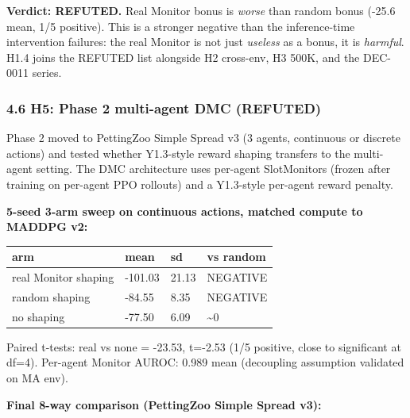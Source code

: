 \documentclass[
]{article}
\newcounter{none} %
\begin{document}
\textbf{Verdict: REFUTED.} Real Monitor bonus is \emph{worse} than
random bonus (-25.6 mean, 1/5 positive). This is a stronger negative
than the inference-time intervention failures: the real Monitor is not
just \emph{useless} as a bonus, it is \emph{harmful}. H1.4 joins the
REFUTED list alongside H2 cross-env, H3 500K, and the DEC-0011 series.

\subsubsection{4.6 H5: Phase 2 multi-agent DMC
(REFUTED)}\label{h5-phase-2-multi-agent-dmc-refuted}

Phase 2 moved to PettingZoo Simple Spread v3 (3 agents, continuous or
discrete actions) and tested whether Y1.3-style reward shaping transfers
to the multi-agent setting. The DMC architecture uses per-agent
SlotMonitors (frozen after training on per-agent PPO rollouts) and a
Y1.3-style per-agent reward penalty.

\textbf{5-seed 3-arm sweep on continuous actions, matched compute to
MADDPG v2:}

{\def\LTcaptype{none} %
\begin{longtable}[]{@{}llll@{}}
\toprule\noalign{}
arm & mean & sd & vs random \\
\midrule\noalign{}
\endhead
\bottomrule\noalign{}
\endlastfoot
real Monitor shaping & -101.03 & 21.13 & NEGATIVE \\
random shaping & -84.55 & 8.35 & NEGATIVE \\
no shaping & -77.50 & 6.09 & \textasciitilde0 \\
\end{longtable}
}

Paired t-tests: real vs none = -23.53, t=-2.53 (1/5 positive, close to
significant at df=4). Per-agent Monitor AUROC: 0.989 mean (decoupling
assumption validated on MA env).

\textbf{Final 8-way comparison (PettingZoo Simple Spread v3):}
\end{document}
